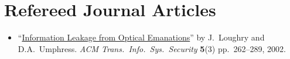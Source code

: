 \section*{Refereed Journal Articles}
\vspace{-2mm}

\begin{itemize}
	\item ``\href{http://dl.acm.org/citation.cfm?doid=545186.545189}{Information
		Leakage from Optical Emanations}'' by J.\ Loughry and D.A.\ Umphress.
		\emph{ACM Trans.\ Info.\ Sys.\ Security} \textbf{5}(3)
		pp.\ 262--289, 2002.
\end{itemize}


